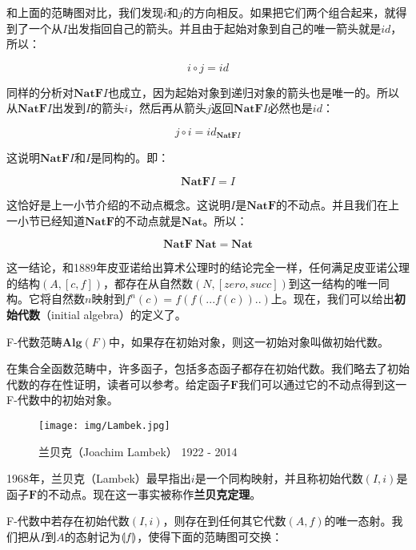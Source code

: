 \documentclass{article}
\begin{document}
和上面的范畴图对比，我们发现$i$和$j$的方向相反。如果把它们两个组合起来，就得到了一个从$I$出发指回自己的箭头。并且由于起始对象到自己的唯一箭头就是$id$，所以：

\[
i \circ j = id
\]

同样的分析对$\mathbf{NatF}I$也成立，因为起始对象到递归对象的箭头也是唯一的。所以从$\mathbf{NatF}I$出发到$I$的箭头$i$，然后再从箭头$j$返回$\mathbf{NatF}I$必然也是$id$：

\[
j \circ i = id_{\mathbf{NatF}I}
\]

这说明$\mathbf{NatF}I$和$I$是同构的。即：

\[
  \mathbf{NatF} I = I
\]

这恰好是上一小节介绍的不动点概念。这说明$I$是$\mathbf{NatF}$的不动点。并且我们在上一小节已经知道$\mathbf{NatF}$的不动点就是$\mathbf{Nat}$。所以：

\[
  \mathbf{NatF}\ \mathbf{Nat} = \mathbf{Nat}
\]

这一结论，和1889年皮亚诺给出算术公理时的结论完全一样，任何满足皮亚诺公理的结构$(A, [c, f])$，都存在从自然数$(N, [zero, succ])$到这一结构的唯一同构。它将自然数$n$映射到$f^n(c) = f(f(...f(c))..)$上。现在，我们可以给出\textbf{初始代数}（initial algebra）的定义了。

\begin{definition}
F-代数范畴$\pmb{Alg}(F)$中，如果存在初始对象，则这一初始对象叫做初始代数。
\end{definition}

在集合全函数范畴中，许多函子，包括多态函子都存在初始代数。我们略去了初始代数的存在性证明，读者可以参考\cite{Manes-Arbib-1986}。给定函子$\mathbf{F}$我们可以通过它的不动点得到这一F-代数中的初始对象。

\begin{figure}[htbp]
 \centering
 \texttt{[image: img/Lambek.jpg]}
 \captionsetup{labelformat=empty}
 \caption{兰贝克（Joachim Lambek） 1922 - 2014}
 \label{fig:Lambek}
\end{figure}

1968年，兰贝克（Lambek）最早指出$i$是一个同构映射，并且称初始代数$(I, i)$是函子$\mathbf{F}$的不动点\cite{Lambek-1968}。现在这一事实被称作\textbf{兰贝克定理}。

F-代数中若存在初始代数$(I, i)$，则存在到任何其它代数$(A, f)$的唯一态射。我们把从$I$到$A$的态射记为$\llparenthesis f \rrparenthesis$，使得下面的范畴图可交换：
\end{document}
